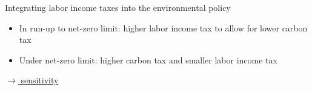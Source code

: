 \documentclass[11pt,aspectratio=169]{beamer}
\begin{document}
\begin{frame}{Integrating labor income taxes into the environmental policy}
\begin{figure}[h!!]
\begin{subfigure}{0.45\textwidth}
		\end{subfigure}
	\end{figure}
	\vspace{3mm}

\begin{block}{}
	\begin{itemize}
		\item In run-up to net-zero limit: higher labor income tax to allow for lower carbon tax
		\item Under net-zero limit: higher carbon tax and smaller labor income tax
	\end{itemize}
\end{block}	
\vspace{-4.5mm}
\hypertarget{backmec}{}
\hfill
\hyperlink{sensphi}{\tiny{$\rightarrow$ sensitivity}}
\end{frame}
\end{document}
